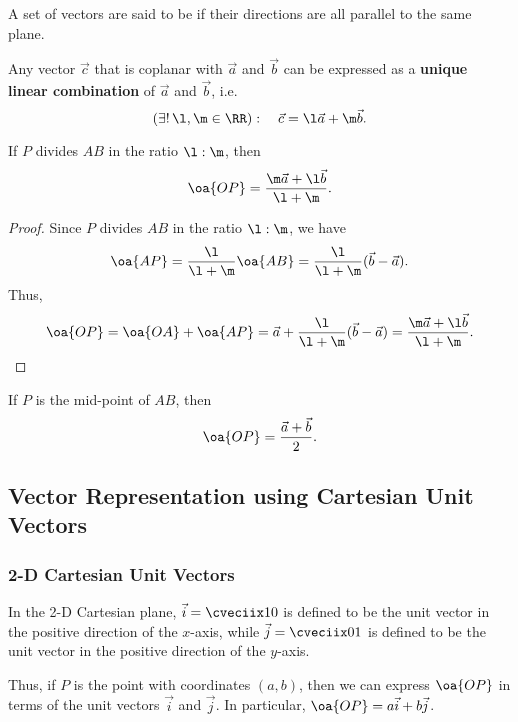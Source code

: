 \begin{definition}
    A set of vectors are said to be  if their directions are all parallel to the same plane.
\end{definition}

\begin{fact}
    Any vector $\vec c$ that is coplanar with $\vec a$ and $\vec b$ can be expressed as a \textbf{unique linear combination} of $\vec a$ and $\vec b$, i.e. \[(\exists! \, \l, \m \in \RR): \quad \vec c = \l \vec a + \m \vec b.\]
\end{fact}

\begin{theorem}
    If $P$ divides $AB$ in the ratio $\l : \m$, then \[\oa{OP} = \frac{\m \vec a + \l \vec b}{\l + \m}.\]
\end{theorem}
\begin{proof}
    Since $P$ divides $AB$ in the ratio $\l : \m$, we have \[\oa{AP} = \frac{\l}{\l + \m} \oa{AB} = \frac{\l}{\l + \m} (\vec b - \vec a).\] Thus, \[\oa{OP} = \oa{OA} + \oa{AP} = \vec a + \frac{\l}{\l + \m} (\vec b - \vec a) = \frac{\m \vec a + \l \vec b}{\l + \m}.\]
\end{proof}

\begin{corollary}
    If $P$ is the mid-point of $AB$, then \[\oa{OP} = \frac{\vec a + \vec b}{2}.\]
\end{corollary}

\subsection{Vector Representation using Cartesian Unit Vectors}

\subsubsection{2-D Cartesian Unit Vectors}

\begin{definition}
    In the 2-D Cartesian plane, $\vec i = \cveciix10$ is defined to be the unit vector in the positive direction of the $x$-axis, while $\vec j = \cveciix01$ is defined to be the unit vector in the positive direction of the $y$-axis.
\end{definition}

Thus, if $P$ is the point with coordinates $(a, b)$, then we can express $\oa{OP}$ in terms of the unit vectors $\vec i$ and $\vec j$. In particular, $\oa{OP} = a\vec i + b \vec j$.

